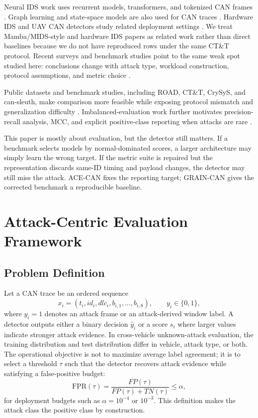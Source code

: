 \documentclass[runningheads]{llncs}
\newcommand{\method}{GRAIN-CAN}
\newcommand{\framework}{ACE-CAN}
\begin{document}
Neural IDS work uses recurrent models, transformers, and tokenized CAN frames \cite{taylor2016frequency,kang2016survival,alkhatib2022canbert}.  Graph learning and state-space models are also used for CAN traces \cite{wang2023statgraph,liu2026mids}.  Hardware IDS and UAV CAN detectors study related deployment settings \cite{seccan2025,khandelsurvey2025,majumder2024uavcan}.  We treat Mamba/MIDS-style and hardware IDS papers as related work rather than direct baselines because we do not have reproduced rows under the same CT\&T protocol.  Recent surveys and benchmark studies point to the same weak spot studied here: conclusions change with attack type, workload construction, protocol assumptions, and metric choice \cite{althunayyan2025survey,sharmin2024benchmarking,guerra2024road}.

Public datasets and benchmark studies, including ROAD, CT\&T, CrySyS, and can-sleuth, make comparison more feasible while exposing protocol mismatch and generalization difficulty \cite{verma2020road,lampe2024ctt,gazdag2023crysys,kidmose2025cansleuth}.  Imbalanced-evaluation work further motivates precision-recall analysis, MCC, and explicit positive-class reporting when attacks are rare \cite{davis2006pr,saito2015pr,chicco2020mcc}.

This paper is mostly about evaluation, but the detector still matters.  If a benchmark selects models by normal-dominated scores, a larger architecture may simply learn the wrong target.  If the metric suite is repaired but the representation discards same-ID timing and payload changes, the detector may still miss the attack.  \framework{} fixes the reporting target; \method{} gives the corrected benchmark a reproducible baseline.

\section{Attack-Centric Evaluation Framework}
\subsection{Problem Definition}
Let a CAN trace be an ordered sequence
\begin{equation}
    x_i=(t_i, id_i, dlc_i, b_{i,1},\ldots,b_{i,8}), \qquad y_i\in\{0,1\},
\end{equation}
where $y_i=1$ denotes an attack frame or an attack-derived window label.  A detector outputs either a binary decision $\hat{y}_i$ or a score $s_i$ where larger values indicate stronger attack evidence.  In cross-vehicle unknown-attack evaluation, the training distribution and test distribution differ in vehicle, attack type, or both.  The operational objective is not to maximize average label agreement; it is to select a threshold $\tau$ such that the detector recovers attack evidence while satisfying a false-positive budget:
\begin{equation}
    \mathrm{FPR}(\tau)=\frac{FP(\tau)}{FP(\tau)+TN(\tau)} \leq \alpha,
\end{equation}
for deployment budgets such as $\alpha=10^{-4}$ or $10^{-3}$.  This definition makes the attack class the positive class by construction.
\end{document}
